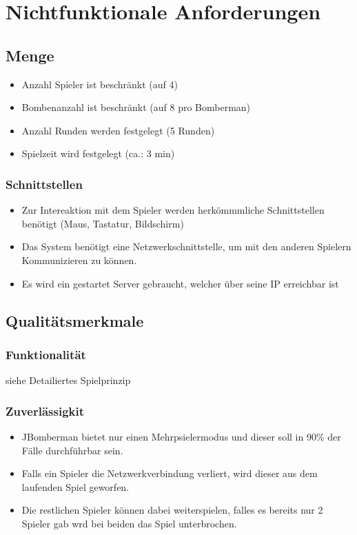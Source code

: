 \documentclass[11pt]{scrartcl}
\begin{document}
\newpage
\section{Nichtfunktionale Anforderungen}
\label{sec:Nicht funktionale Anforderungen}


\subsection{Menge}
\label{sec:Menge}
\begin{itemize}
    \item Anzahl Spieler ist beschränkt (auf 4)
    \item Bombenanzahl ist beschränkt (auf 8 pro Bomberman)
    \item Anzahl Runden werden festgelegt (5 Runden)
    \item Spielzeit wird festgelegt (ca.: 3 min)
\end{itemize}



\subsubsection{Schnittstellen}
\label{sec:Schnittstellen}
\begin{itemize}
    \item Zur Intereaktion mit dem Spieler werden herkömmmliche Schnittstellen benötigt (Maus, Tastatur, Bildschirm)
    \item Das System benötigt eine Netzwerkschnittstelle, um mit den anderen Spielern Kommunizieren zu können.
    \item Es wird ein gestartet Server gebraucht, welcher über seine IP erreichbar ist
\end{itemize}

\subsection{Qualitätsmerkmale}
\label{sec:Qualitätsmermale}

\subsubsection{Funktionalität}
\label{sec:Funktionalität}
siehe Detailiertes Spielprinzip


\subsubsection{Zuverlässigkit}
\label{sec:Zuverlässigkeit}
\begin{itemize}
    \item JBomberman bietet nur einen Mehrpsielermodus und dieser soll in 90\% der Fälle durchführbar sein.
    \item Falls ein Spieler die Netzwerkverbindung verliert, wird dieser aus dem laufenden Spiel geworfen.
    \item Die restlichen Spieler können dabei weiterspielen, falles es bereits nur 2 Spieler gab wrd bei beiden das Spiel unterbrochen.
\end{itemize}
\end{document}
